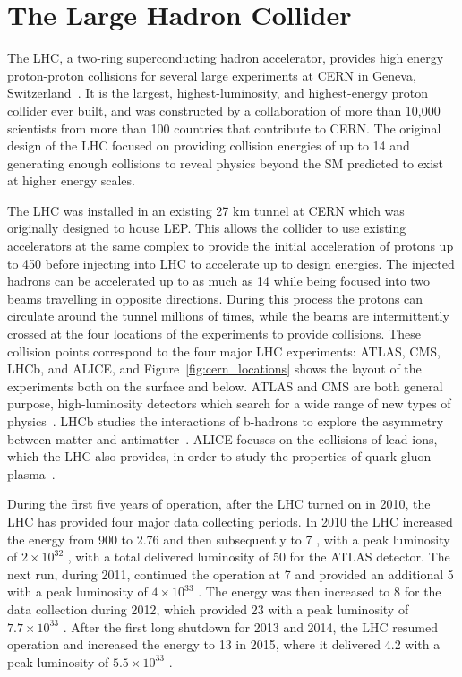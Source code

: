 \chapter{The Large Hadron Collider}

\label{ch:lhc}

The \ac{LHC}, a two-ring superconducting hadron accelerator, provides high energy proton-proton collisions for several large experiments at \ac{CERN} in Geneva, Switzerland~\cite{lhc_machine, lhc_guide}. 
It is the largest, highest-luminosity, and highest-energy proton collider ever built, and was constructed by a collaboration of more than 10,000 scientists from more than 100 countries that contribute to \ac{CERN}.
The original design of the \ac{LHC} focused on providing collision energies of up to 14 \TeV and generating enough collisions to reveal physics beyond the \ac{SM} predicted to exist at higher energy scales.

The \ac{LHC} was installed in an existing 27 km tunnel at \ac{CERN} which was originally designed to house \ac{LEP}.
This allows the collider to use existing accelerators at the same complex to provide the initial acceleration of protons up to 450 \GeV before injecting into \ac{LHC} to accelerate up to design energies.
The injected hadrons can be accelerated up to as much as 14 \TeV while being focused into two beams travelling in opposite directions.
During this process the protons can circulate around the tunnel millions of times, while the beams are intermittently crossed at the four locations of the experiments to provide collisions.
These collision points correspond to the four major \ac{LHC} experiments: \ac{ATLAS}, \ac{CMS}, \ac{LHCb}, and \ac{ALICE}, and Figure~\ref{fig:cern_locations} shows the layout of the experiments both on the surface and below.
\ac{ATLAS} and \ac{CMS} are both general purpose, high-luminosity detectors which search for a wide range of new types of physics~\cite{atlas_experiment, cms_experiment}.
\ac{LHCb} studies the interactions of b-hadrons to explore the asymmetry between matter and antimatter~\cite{lhcb_experiment}.
\ac{ALICE} focuses on the collisions of lead ions, which the \ac{LHC} also provides, in order to study the properties of quark-gluon plasma~\cite{alice_experiment}.

During the first five years of operation, after the \ac{LHC} turned on in 2010, the \ac{LHC} has provided four major data collecting periods.
In 2010 the \ac{LHC} increased the energy from 900 \GeV to 2.76 \TeV and then subsequently to 7 \TeV, with a peak luminosity of $2 \times 10^{32}$ \lcms, with a total delivered luminosity of 50 \ipb for the \ac{ATLAS} detector.
The next run, during 2011, continued the operation at 7 \TeV and provided an additional 5 \ifb with a peak luminosity of $4 \times 10^{33}$ \lcms. 
The energy was then increased to 8 \TeV for the data collection during 2012, which provided 23 \ifb with a peak luminosity of $7.7 \times 10^{33}$ \lcms.
After the first long shutdown for 2013 and 2014, the \ac{LHC} resumed operation and increased the energy to 13 \TeV in 2015, where it delivered 4.2 \ifb with a peak luminosity of $5.5 \times 10^{33}$ \lcms. 

